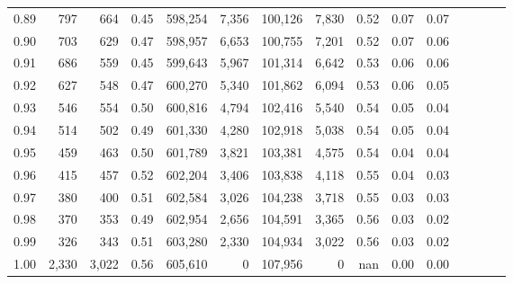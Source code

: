 \begin{tabular}{rrrcrrrrrrrrrrr}
0.89 &     797 &    664 &                                       0.45 &  598,254 &    7,356 &  100,126 &    7,830 &  0.52 &  0.07 &                         0.07 \\
0.90 &     703 &    629 &                                       0.47 &  598,957 &    6,653 &  100,755 &    7,201 &  0.52 &  0.07 &                         0.06 \\
0.91 &     686 &    559 &                                       0.45 &  599,643 &    5,967 &  101,314 &    6,642 &  0.53 &  0.06 &                         0.06 \\
0.92 &     627 &    548 &                                       0.47 &  600,270 &    5,340 &  101,862 &    6,094 &  0.53 &  0.06 &                         0.05 \\
0.93 &     546 &    554 &                                       0.50 &  600,816 &    4,794 &  102,416 &    5,540 &  0.54 &  0.05 &                         0.04 \\
0.94 &     514 &    502 &                                       0.49 &  601,330 &    4,280 &  102,918 &    5,038 &  0.54 &  0.05 &                         0.04 \\
0.95 &     459 &    463 &                                       0.50 &  601,789 &    3,821 &  103,381 &    4,575 &  0.54 &  0.04 &                         0.04 \\
0.96 &     415 &    457 &                                       0.52 &  602,204 &    3,406 &  103,838 &    4,118 &  0.55 &  0.04 &                         0.03 \\
0.97 &     380 &    400 &                                       0.51 &  602,584 &    3,026 &  104,238 &    3,718 &  0.55 &  0.03 &                         0.03 \\
0.98 &     370 &    353 &                                       0.49 &  602,954 &    2,656 &  104,591 &    3,365 &  0.56 &  0.03 &                         0.02 \\
0.99 &     326 &    343 &                                       0.51 &  603,280 &    2,330 &  104,934 &    3,022 &  0.56 &  0.03 &                         0.02 \\
1.00 &   2,330 &  3,022 &                                       0.56 &  605,610 &        0 &  107,956 &        0 &   nan &  0.00 &                         0.00 \\
\bottomrule
\end{tabular}
